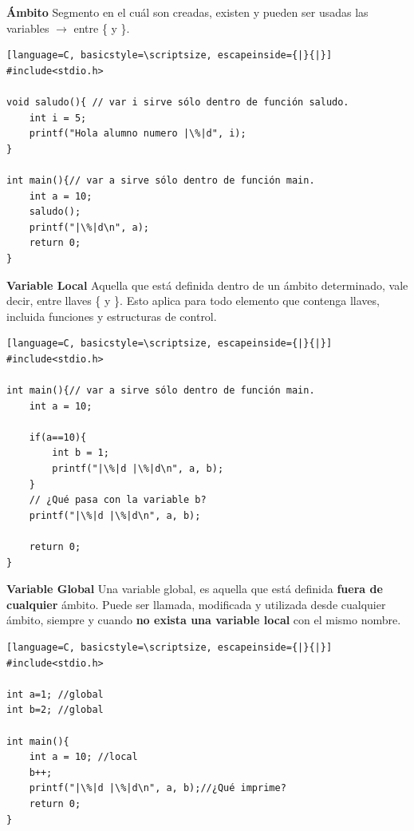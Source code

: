 \documentclass{article}
\begin{document}
\begin{itemize}
\begin{minipage}[h]{0.45\textwidth}
\item \textbf{Ámbito}
Segmento en el cuál son creadas, existen y pueden ser usadas las variables $\rightarrow$ entre \{ y \}.

\begin{lstlisting}[language=C, basicstyle=\scriptsize, escapeinside={|}{|}] 
#include<stdio.h>

void saludo(){ // var i sirve sólo dentro de función saludo.
	int i = 5;
	printf("Hola alumno numero |\%|d", i);
}

int main(){// var a sirve sólo dentro de función main. 
	int a = 10;
	saludo();
	printf("|\%|d\n", a);
	return 0;
}
\end{lstlisting}
\end{minipage}

\begin{minipage}[h]{0.45\textwidth}
\item \textbf{Variable Local} 
Aquella que está definida dentro de un ámbito determinado, vale decir, entre llaves \{ y \}. Esto aplica para todo elemento que contenga llaves, incluida funciones y estructuras de control. 

\begin{lstlisting}[language=C, basicstyle=\scriptsize, escapeinside={|}{|}]  
#include<stdio.h>

int main(){// var a sirve sólo dentro de función main. 
	int a = 10;

	if(a==10){
		int b = 1;
		printf("|\%|d |\%|d\n", a, b);
	}
	// ¿Qué pasa con la variable b?
	printf("|\%|d |\%|d\n", a, b); 

	return 0;
}
\end{lstlisting}
\end{minipage}
\hspace{0.5cm}
\begin{minipage}[h]{0.45\textwidth}
\item \textbf{Variable Global}
Una variable global, es aquella que está definida \textbf{fuera de cualquier} ámbito. Puede ser llamada, modificada y utilizada desde cualquier ámbito, siempre y cuando \textbf{no exista una variable local} con el mismo nombre. 
\begin{lstlisting}[language=C, basicstyle=\scriptsize, escapeinside={|}{|}] 
#include<stdio.h>

int a=1; //global
int b=2; //global

int main(){
	int a = 10; //local
	b++;
	printf("|\%|d |\%|d\n", a, b);//¿Qué imprime? 
	return 0;
}
\end{lstlisting}
\end{minipage}

\end{itemize}
\end{document}

